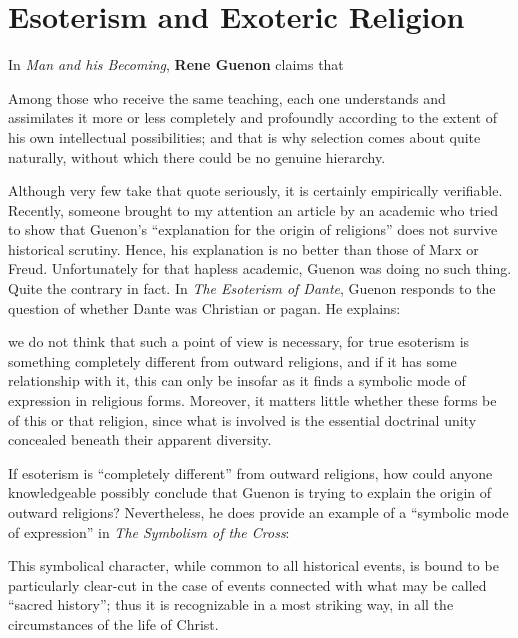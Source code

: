 \section{Esoterism and Exoteric Religion}

In \emph{Man and his Becoming}, \textbf{Rene Guenon} claims that

\begin{quotex}
Among those who receive the same teaching, each one understands and assimilates it more or less completely and profoundly according to the extent of his own intellectual possibilities; and that is why selection comes about quite naturally, without which there could be no genuine hierarchy.
\end{quotex}

Although very few take that quote seriously, it is certainly empirically verifiable. Recently, someone brought to my attention an article by an academic who tried to show that Guenon's ``explanation for the origin of religions'' does not survive historical scrutiny. Hence, his explanation is no better than those of Marx or Freud. Unfortunately for that hapless academic, Guenon was doing no such thing. Quite the contrary in fact. In \emph{The Esoterism of Dante}, Guenon responds to the question of whether Dante was Christian or pagan. He explains:

\begin{quotex}
we do not think that such a point of view is necessary, for true esoterism is something completely different from outward religions, and if it has some relationship with it, this can only be insofar as it finds a symbolic mode of expression in religious forms. Moreover, it matters little whether these forms be of this or that religion, since what is involved is the essential doctrinal unity concealed beneath their apparent diversity.
\end{quotex}


If esoterism is ``completely different'' from outward religions, how could anyone knowledgeable possibly conclude that Guenon is trying to explain the origin of outward religions? Nevertheless, he does provide an example of a ``symbolic mode of expression'' in \emph{The Symbolism of the Cross}:

\begin{quotex}
This symbolical character, while common to all historical events, is bound to be particularly clear-cut in the case of events connected with what may be called ``sacred history''; thus it is recognizable in a most striking way, in all the circumstances of the life of Christ.
\end{quotex}


